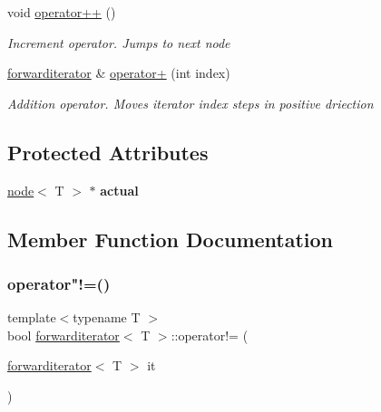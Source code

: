 \begin{DoxyCompactItemize}
void \mbox{\hyperlink{classforwarditerator_acdf448963d78458a861511435f14d885}{operator++}} ()
\begin{DoxyCompactList}\small\item\em Increment operator. Jumps to next node \end{DoxyCompactList}\item 
\mbox{\hyperlink{classforwarditerator}{forwarditerator}} \& \mbox{\hyperlink{classforwarditerator_a380be6fded24cf931671d22bf0887eb0}{operator+}} (int index)
\begin{DoxyCompactList}\small\item\em Addition operator. Moves iterator index steps in positive driection \end{DoxyCompactList}\end{DoxyCompactItemize}
\subsection*{Protected Attributes}
\begin{DoxyCompactItemize}
\item 
\mbox{\label{classforwarditerator_ae13eb97cc8ce536d1bd8230ab53d3a74}} 
\mbox{\hyperlink{classnode}{node}}$<$ T $>$ $\ast$ {\bfseries actual}
\end{DoxyCompactItemize}


\subsection{Member Function Documentation}
\mbox{\label{classforwarditerator_a01a4fa4d5611a1b141ff21f5b513391a}} 
\subsubsection{\texorpdfstring{operator"!=()}{operator!=()}}
{\footnotesize\ttfamily template$<$typename T $>$ \\
bool \mbox{\hyperlink{classforwarditerator}{forwarditerator}}$<$ T $>$\+::operator!= (\begin{DoxyParamCaption}\item[{\mbox{\hyperlink{classforwarditerator}{forwarditerator}}$<$ T $>$}]{it }\end{DoxyParamCaption})}




